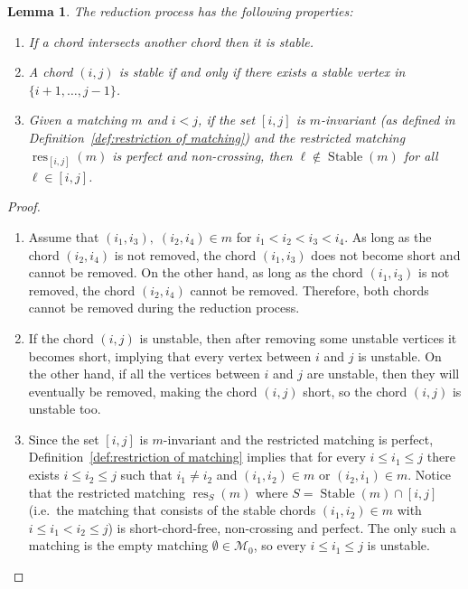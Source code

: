 \documentclass[11pt]{article}
\newtheorem{lemma}[theo]{Lemma}
\theoremstyle{definition}
\providecommand{\ie}{i.e.\ }
\numberwithin{equation}{section}
\newcommand{\Stable}{\operatorname{Stable}}
\newcommand{\res}{\operatorname{res}}
\newcommand{\M}{\mathcal{M}}
\begin{document}
\begin{lemma}
\label{lem:properties of core}
    The reduction process has the following properties:
    \begin{enumerate}[label=(\arabic*), ref=\ref{lem:properties of core}\text{ (part~}\arabic*)]
        \item \label{lem:properties of core--intersect stable} If a chord intersects another chord then it is stable.
        \item \label{lem:properties of core--chord unstable iff all midpoints unstable} A chord $(i,j)$ is stable if and only if there exists a stable vertex in $\{i+1,\dots,j-1\}$.
        \item \label{lem:properties of core--perfect non-crossing unstable} Given a matching $m$ and $i < j$, if the set $[i,j]$ is $m$-invariant \textup{(}as defined in Definition~\ref{def:restriction of matching}\textup{)} and the restricted matching $\res_{[i,j]}(m)$ is perfect and non-crossing, then $\ell \notin \Stable(m)$ for all $\ell \in [i,j]$.
    \end{enumerate}
\end{lemma}

\begin{proof} \hfill %
    \begin{enumerate}
        \item Assume that $(i_1,i_3),\; (i_2,i_4) \in m$ for $i_1 < i_2 < i_3 < i_4$. As long as the chord $(i_2,i_4)$ is not removed, the chord $(i_1,i_3)$ does not become short and cannot be removed. On the other hand, as long as the chord $(i_1,i_3)$ is not removed, the chord $(i_2,i_4)$ cannot be removed. Therefore, both chords cannot be removed during the reduction process.
        \item If the chord $(i,j)$ is unstable, then after removing some unstable vertices it becomes short, implying that every vertex between $i$ and $j$ is unstable. On the other hand, 
        if all the vertices between $i$ and $j$ are unstable, then they will eventually be removed, making the chord $(i,j)$ short, so the chord $(i,j)$ is unstable too.
        \item %
        Since the set $[i,j]$ is $m$-invariant and the restricted matching is perfect, Definition~\ref{def:restriction of matching} implies that for every $i \le i_1 \le j$ there exists $i \le i_2 \le j$ such that $i_1 \ne i_2$ and $(i_1,i_2) \in m$ or $(i_2,i_1) \in m$.
        Notice that the restricted matching $\res_S(m)$ where $S = \Stable(m) \cap [i,j]$ (\ie the matching that consists of the stable chords $(i_1,i_2) \in m$ with $i \le i_1<i_2 \le j$) is short-chord-free, non-crossing and perfect. The only such a matching is the empty matching $\emptyset \in \M_0$, so every $i \le i_1 \le j$ is unstable.
        \qedhere
    \end{enumerate}
\end{proof}
\end{document}
